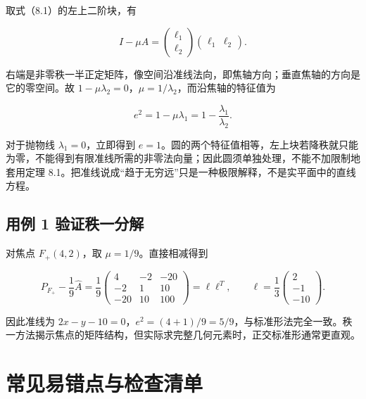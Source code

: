 \documentclass[11pt,a4paper]{article}
\begin{document}
取式（8.1）的左上二阶块，有

\begin{equation*}
I-\mu A=\begin{pmatrix}\ell_1\\\ell_2\end{pmatrix}\begin{pmatrix}\ell_1&\ell_2\end{pmatrix}.\tag{8.2}
\end{equation*}

右端是非零秩一半正定矩阵，像空间沿准线法向，即焦轴方向；垂直焦轴的方向是它的零空间。故
\(1-\mu\lambda_2=0\)，\(\mu=1/\lambda_2\)，而沿焦轴的特征值为

\begin{equation*}
e^2=1-\mu\lambda_1=1-\frac{\lambda_1}{\lambda_2}.
\end{equation*}

对于抛物线 \(\lambda_1=0\)，立即得到
\(e=1\)。圆的两个特征值相等，左上块若降秩就只能为零，不能得到有限准线所需的非零法向量；因此圆须单独处理，不能不加限制地套用定理
8.1。把准线说成``趋于无穷远''只是一种极限解释，不是实平面中的直线方程。

\subsection{用例 1
验证秩一分解}\label{ux7528ux4f8b-1-ux9a8cux8bc1ux79e9ux4e00ux5206ux89e3}

对焦点 \(F_+(4,2)\)，取 \(\mu=1/9\)。直接相减得到

\begin{equation*}
P_{F_+}-\frac19\widehat A=\frac19\begin{pmatrix}4&-2&-20\\-2&1&10\\-20&10&100\end{pmatrix}=\ell\ell^T,\qquad \ell=\frac13\begin{pmatrix}2\\-1\\-10\end{pmatrix}.
\end{equation*}

因此准线为
\(2x-y-10=0\)，\(e^2=(4+1)/9=5/9\)，与标准形法完全一致。秩一方法揭示焦点的矩阵结构，但实际求完整几何元素时，正交标准形通常更直观。

\section{常见易错点与检查清单}\label{ux5e38ux89c1ux6613ux9519ux70b9ux4e0eux68c0ux67e5ux6e05ux5355}
\end{document}
